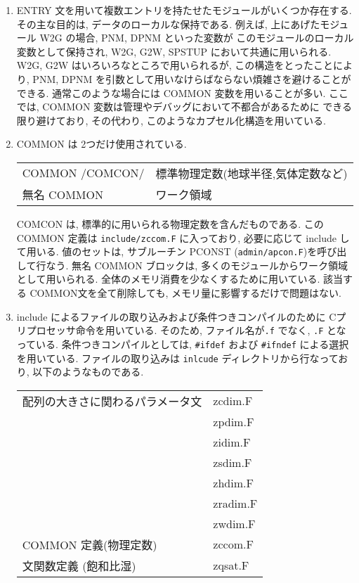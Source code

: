 \begin{enumerate}
\item ENTRY 文を用いて複数エントリを持たせたモジュールがいくつか存在する.
その主な目的は, データのローカルな保持である.
例えば, 上にあげたモジュール W2G の場合, PNM, DPNM といった変数が
このモジュールのローカル変数として保持され,
W2G, G2W, SPSTUP において共通に用いられる.
W2G, G2W はいろいろなところで用いられるが, この構造をとったことにより,
PNM, DPNM を引数として用いなけらばならない煩雑さを避けることができる.
通常このような場合には COMMON 変数を用いることが多い.
ここでは, COMMON 変数は管理やデバッグにおいて不都合があるために
できる限り避けており, その代わり, このようなカプセル化構造を用いている.

\item COMMON は 2つだけ使用されている.
\begin{center}
  \begin{tabular}{ll}
    COMMON /COMCON/  & 標準物理定数(地球半径,気体定数など) \\
    無名 COMMON      & ワーク領域 \\
  \end{tabular}
\end{center}
COMCON は, 標準的に用いられる物理定数を含んだものである.
この COMMON 定義は {\tt include/zccom.F} に入っており,
必要に応じて include して用いる. 
値のセットは,  サブルーチン PCONST ({\tt admin/apcon.F})を呼び出して行なう.
%
無名 COMMON ブロックは, 多くのモジュールからワーク領域として用いられる.
全体のメモリ消費を少なくするために用いている.
該当する COMMON文を全て削除しても, メモリ量に影響するだけで問題はない.

\item include によるファイルの取り込みおよび条件つきコンパイルのために
Cプリプロセッサ命令を用いている. 
そのため, ファイル名が{\tt *.f} でなく, {\tt *.F} となっている.
条件つきコンパイルとしては, 
{\tt \#ifdef} および {\tt \#ifndef} による選択を用いている.
ファイルの取り込みは {\tt inlcude} ディレクトリから行なっており,
以下のようなものである. 
\begin{center}
  \begin{tabular}{ll}
    配列の大きさに関わるパラメータ文 & zcdim.F \\
                                     & zpdim.F \\
                                     & zidim.F \\
                                     & zsdim.F \\
                                     & zhdim.F \\
                                     & zradim.F \\
                                     & zwdim.F \\
    COMMON 定義(物理定数)            & zccom.F \\
    文関数定義 (飽和比湿)            & zqsat.F \\
  \end{tabular}
\end{center}


\end{enumerate}
